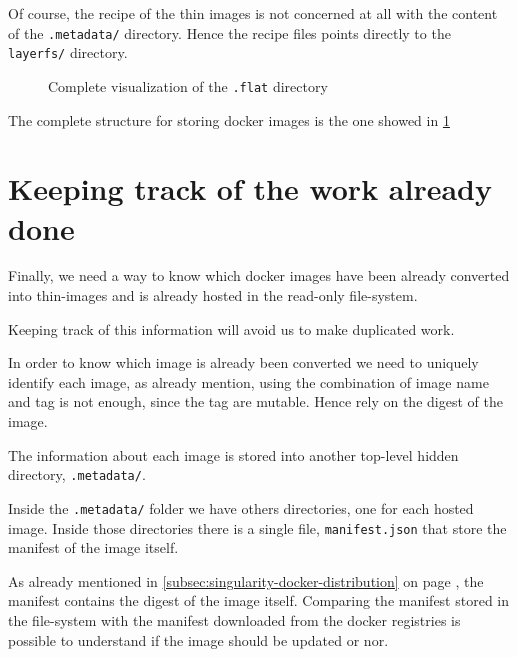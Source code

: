 Of course, the recipe of the thin images is not concerned at all with the
content of the \texttt{.metadata/} directory.  Hence the recipe files points
directly to the \texttt{layerfs/} directory.

\begin{figure}
\caption{Complete visualization of the \texttt{.flat} directory}
\label{fig:docker-layer-structure}
\end{figure}

The complete structure for storing docker images is the one showed in
\ref{fig:docker-layer-structure}

\section{Keeping track of the work already done}

Finally, we need a way to know which docker images have been already converted
into thin-images and is already hosted in the read-only file-system.

Keeping track of this information will avoid us to make duplicated work.

In order to know which image is already been converted we need to uniquely
identify each image, as already mention, using the combination of image name
and tag is not enough, since the tag are mutable.  Hence rely on the digest of
the image.

The information about each image is stored into another top-level hidden
directory, \texttt{.metadata/}.

Inside the \texttt{.metadata/} folder we have others directories, one for each
hosted image.  Inside those directories there is a single file,
\texttt{manifest.json} that store the manifest of the image itself.

As already mentioned in \ref{subsec:singularity-docker-distribution} on page
\pageref{subsec:singularity-docker-distribution}, the manifest contains the
digest of the image itself.  Comparing the manifest stored in the file-system
with the manifest downloaded from the docker registries is possible to
understand if the image should be updated or nor.

